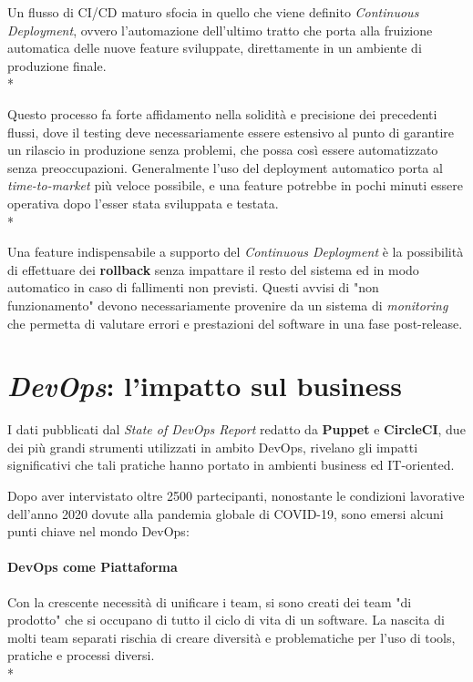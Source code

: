 \documentclass[a4paper,12pt]{report}
\begin{document}
					Un flusso di CI/CD maturo sfocia in quello che viene definito \emph{Continuous Deployment}, ovvero l'automazione dell'ultimo tratto che porta alla fruizione automatica delle nuove feature sviluppate, direttamente in un ambiente di produzione finale.\\*
					
					Questo processo fa forte affidamento nella solidità e precisione dei precedenti flussi, dove il testing deve necessariamente essere estensivo al punto di garantire un rilascio in produzione senza problemi, che possa così essere automatizzato senza preoccupazioni. Generalmente l'uso del deployment automatico porta al \emph{time-to-market} più veloce possibile, e una feature potrebbe in pochi minuti essere operativa dopo l'esser stata sviluppata e testata.\\*
					
					Una feature indispensabile a supporto del \emph{Continuous Deployment} è la possibilità di effettuare dei \textbf{rollback} senza impattare il resto del sistema ed in modo automatico in caso di fallimenti non previsti. Questi avvisi di "non funzionamento" devono necessariamente provenire da un sistema di \emph{monitoring} che permetta di valutare errori e prestazioni del software in una fase post-release.
					
	    \section{\emph{DevOps}: l'impatto sul business}
	        
	        I dati pubblicati dal \emph{State of DevOps Report} redatto da \textbf{Puppet} e \textbf{CircleCI}, due dei più grandi strumenti utilizzati in ambito DevOps, rivelano gli impatti significativi che tali pratiche hanno portato in ambienti business ed IT-oriented.
	        
	        Dopo aver intervistato oltre 2500 partecipanti, nonostante le condizioni lavorative dell'anno 2020 dovute alla pandemia globale di COVID-19, sono emersi alcuni punti chiave nel mondo DevOps:
	        
	        \paragraph{DevOps come Piattaforma}
	        Con la crescente necessità di unificare i team, si sono creati dei team "di prodotto" che si occupano di tutto il ciclo di vita di un software. La nascita di molti team separati rischia di creare diversità e problematiche per l'uso di tools, pratiche e processi diversi.\\*
	        
\end{document}
